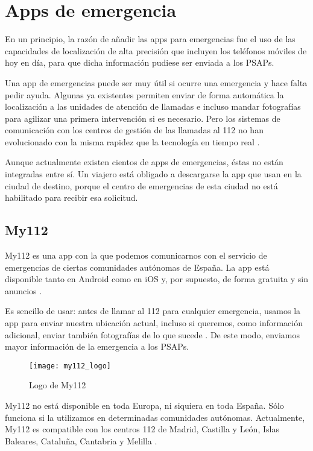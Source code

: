 \section{Apps de emergencia}

En un principio, la razón de añadir las apps para emergencias fue el uso de las capacidades de localización de alta precisión que incluyen los teléfonos móviles de hoy en día, para que dicha información pudiese ser enviada a los PSAPs.

Una app de emergencias puede ser muy útil si ocurre una emergencia y hace falta pedir ayuda. Algunas ya existentes permiten enviar de forma automática la localización a las unidades de atención de llamadas e incluso mandar fotografías para agilizar una primera intervención si es necesario. Pero los sistemas de comunicación con los centros de gestión de las llamadas al 112 no han evolucionado con la misma rapidez que la tecnología en tiempo real \cite{eena1}.

Aunque actualmente existen cientos de apps de emergencias, éstas no están integradas entre sí. Un viajero está obligado a descargarse la app que usan en la ciudad de destino, porque el centro de emergencias de esta ciudad no está habilitado para recibir esa solicitud.

\subsection{My112}

My112 es una app con la que podemos comunicarnos con el servicio de emergencias de ciertas comunidades autónomas de España. La app está disponible tanto en Android como en iOS y, por supuesto, de forma gratuita y sin anuncios \cite{myapp3}.

Es sencillo de usar: antes de llamar al 112 para cualquier emergencia, usamos la app para enviar nuestra ubicación actual, incluso si queremos, como información adicional, enviar también fotografías de lo que sucede \cite{myapp1}. De este modo, enviamos mayor información de la emergencia a los PSAPs.

\begin{figure}[htp!]
  \centering
  \texttt{[image: my112\_logo]}
  \caption{Logo de My112}
  \label{fig:my112_logo}
\end{figure}

My112 no está disponible en toda Europa, ni siquiera en toda España. Sólo funciona si la utilizamos en determinadas comunidades autónomas. Actualmente, My112 es compatible con los centros 112 de Madrid, Castilla y León, Islas Baleares, Cataluña, Cantabria y Melilla \cite{myapp2}.

